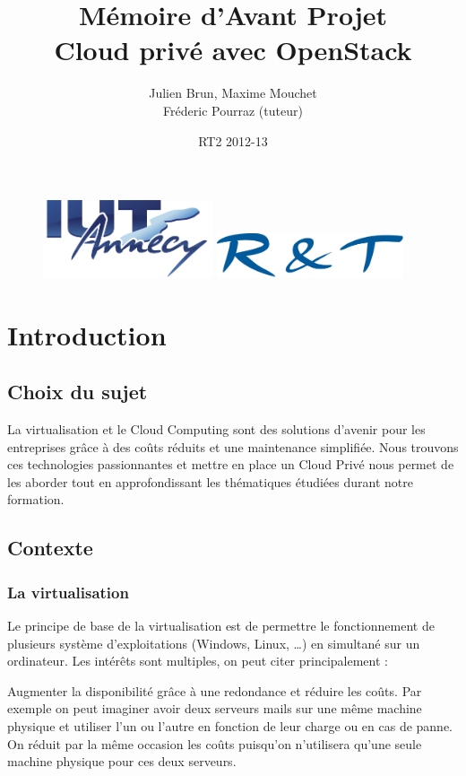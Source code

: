 \documentclass{report}
\title{Mémoire d'Avant Projet \\ \og Cloud privé avec OpenStack \fg}
\author{Julien Brun, Maxime Mouchet \\ Fréderic Pourraz (tuteur)}
\date{RT2 2012-13}
\begin{document}
\begin{figure}
\includegraphics[width=5cm]{images/iut.png}\hfill
\includegraphics[width=5.5cm]{images/rt.png}
\end{figure}

\maketitle

\renewcommand{\contentsname}{Sommaire}
\tableofcontents

\chapter{Introduction}
\section{Choix du sujet}
La virtualisation et le Cloud Computing sont des solutions d'avenir pour les entreprises grâce à des coûts réduits et une maintenance simplifiée. Nous trouvons ces technologies passionnantes et mettre en place un Cloud Privé nous permet de les aborder tout en approfondissant les thématiques étudiées durant notre formation.

\section{Contexte}
\subsection{La virtualisation}
Le principe de base de la virtualisation est de permettre le fonctionnement de plusieurs système d’exploitations (Windows, Linux, …) en simultané sur un ordinateur.
Les intérêts sont multiples, on peut citer principalement :\newline

Augmenter la disponibilité grâce à une redondance et réduire les coûts. Par exemple on peut imaginer avoir deux serveurs mails sur une même machine physique et utiliser l’un ou l’autre en fonction de leur charge ou en cas de panne. On réduit par la même occasion les coûts puisqu’on n’utilisera qu’une seule machine physique pour ces deux serveurs.
\end{document}
